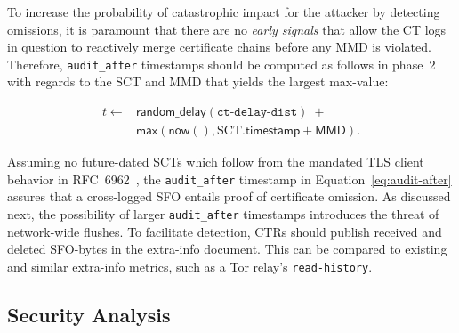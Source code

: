 To increase the probability of catastrophic impact for the attacker by detecting
omissions, it is paramount that there are no \emph{early signals} that
allow the CT logs in question to reactively merge certificate chains before
any MMD is violated.  Therefore, \texttt{audit\_after} timestamps should be
computed as follows in phase~2 with regards to the SCT and MMD that yields the
largest max-value:

\begin{equation} \label{eq:audit-after}
	\begin{aligned}
		t \gets& \mathsf{random\_delay}(\texttt{ct-delay-dist})\;+ \\
		&\mathsf{max}(
			\mathsf{now}(),
			\textrm{SCT}.\mathsf{timestamp}+\mathsf{MMD}
		).
	\end{aligned}
\end{equation}

Assuming no future-dated SCTs which follow from the mandated TLS client behavior
in RFC~6962~\cite{ct}, the \texttt{audit\_after} timestamp in
Equation~\ref{eq:audit-after} assures that a cross-logged SFO entails proof
of certificate omission.  As discussed next, the possibility of larger
\texttt{audit\_after} timestamps introduces the threat of network-wide flushes.
To facilitate detection, CTRs should publish received and deleted SFO-bytes in
the extra-info document.  This can be compared to existing and similar
extra-info metrics, such as a Tor relay's \texttt{read-history}.

\subsection{Security Analysis}
